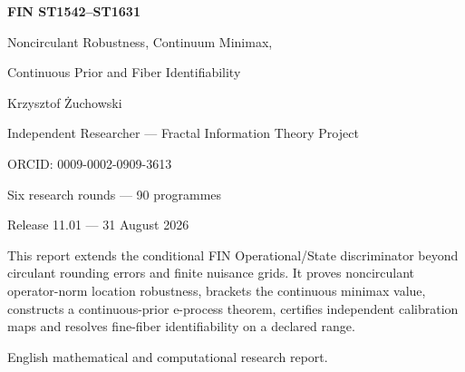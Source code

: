 \documentclass[11pt,a4paper]{article}
\begin{document}
\begin{titlepage}\centering\vspace*{14mm}
{\Huge\bfseries FIN ST1542--ST1631\par}\vspace{4mm}
{\LARGE Noncirculant Robustness, Continuum Minimax,\par}\vspace{2mm}
{\LARGE Continuous Prior and Fiber Identifiability\par}\vspace{12mm}
{\Large Krzysztof \.Zuchowski\par}
{\normalsize Independent Researcher --- Fractal Information Theory Project\par}
{\normalsize ORCID: 0009-0002-0909-3613\par}\vspace{9mm}
{\large Six research rounds --- 90 programmes\par}
{\large Release 11.01 --- 31 August 2026\par}
\vfill
\begin{minipage}{.87\textwidth}\small
This report extends the conditional FIN Operational/State discriminator beyond
circulant rounding errors and finite nuisance grids.  It proves noncirculant
operator-norm location robustness, brackets the continuous minimax value,
constructs a continuous-prior e-process theorem, certifies independent
calibration maps and resolves fine-fiber identifiability on a declared range.
\end{minipage}\vfill
{\small English mathematical and computational research report.}
\end{titlepage}
\end{document}
